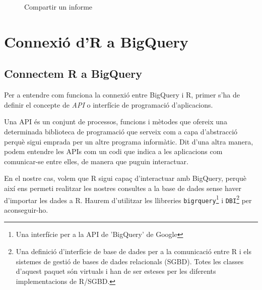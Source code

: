 \documentclass[12pt,longbibliography]{article}
\theoremstyle{definition}
\theoremstyle{remark}
\begin{document}
\begin{figure}[h!]
\par
{}%
\hfill
{}%
\par

\caption{Compartir un informe}
\label{fig:ds6}
\end{figure}

\newpage

\section{Connexió d'R a BigQuery}

\subsection{Connectem R a BigQuery}

Per a entendre com funciona la connexió entre BigQuery i R, primer s'ha de definir el concepte de \emph{API} o interfície de programació d'aplicacions.


Una API és un conjunt de processos, funcions i mètodes que ofereix una determinada biblioteca de programació que serveix com a capa d'abstracció perquè sigui emprada per un altre programa informàtic. Dit d'una altra manera, podem entendre les APIs com un codi que indica a les aplicacions com comunicar-se entre elles, de manera que puguin interactuar.


En el nostre cas, volem que R sigui capaç d'interactuar amb BigQuery, perquè així ens permeti realitzar les nostres consultes a la base de dades sense haver d'importar les dades a R. Haurem d'utilitzar les llibreries \texttt{bigrquery}\footnote{Una interfície per a la API de 'BigQuery' de Google} i \texttt{DBI}\footnote{Una definició d'interfície de base de dades per a la comunicació entre R i els sistemes de gestió de bases de dades relacionals (SGBD). Totes les classes d'aquest paquet són virtuals i han de ser esteses per les diferents implementacions de R/SGBD.} per aconseguir-ho. 
\end{document}
